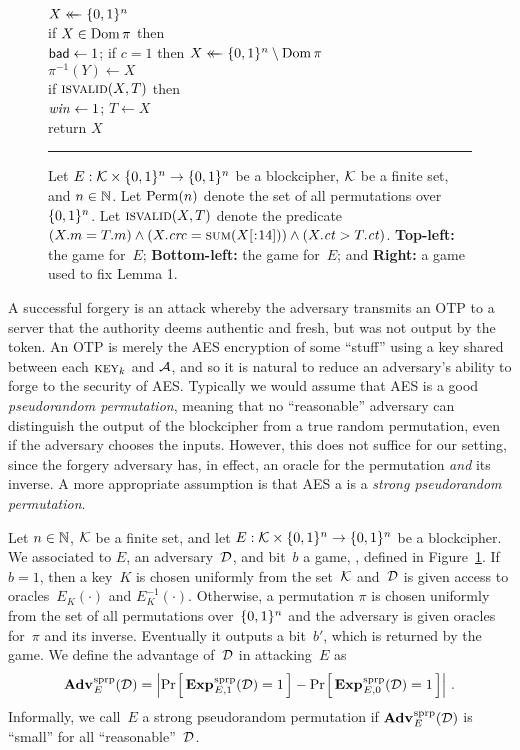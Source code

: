 \begin{figure}[t]
{      $X \mathrel{\leftarrow\mkern-14mu\leftarrow} \{0,1\}^n$\\
      if $X \in \mathrm{Dom}\, \pi$ then\\
      \tab $\mathsf{bad} \gets 1$; if $c=1$ then $X \mathrel{\leftarrow\mkern-14mu\leftarrow} \{0,1\}^n \setminus \mathrm{Dom}\, \pi$\\
      $\pi^{-1}(Y) \gets X$\\
      if $\textsc{isvalid}(X,T)$ then\\
      \tab $\mathit{win} \gets 1$; $T \gets X$\\
      return $X$
  }
  \caption{Let $E:\mathcal{K}\times\{0,1\}^n\to\{0,1\}^n$ be a blockcipher, $\mathcal{K}$ be a
    finite set, and $n\in\mathbb{N}$. Let $\mathrm{Perm}(n)$ denote the set of all permutations
    over $\{0,1\}^n$. Let $\textsc{isvalid}(X,T)$ denote the predicate $(X.m = T.m) \AND (X.\crc =
    \checksum(\substr(X,,14))) \AND (X.\ct > T.\ct)$.
  \textbf{Top-left:} the \forge game for~$E$;
  \textbf{Bottom-left:} the \sprp game for~$E$; and
  \textbf{Right:} a game used to fix Lemma 1.}
  \label{fig1}
  \vspace{6pt}
  \hrule
\end{figure}
A successful forgery is an attack whereby the adversary transmits an OTP to a
server that the authority deems authentic and fresh, but was not output by the
token.
%
An OTP is merely the AES encryption of some ``stuff'' using a key shared between
each $\textsc{key}_k$ and $\mathcal{A}$, and so it is natural to reduce an adversary's ability
to forge to the security of AES.
%
Typically we would assume that AES is a good \emph{pseudorandom permutation},
meaning that no ``reasonable'' adversary can distinguish the output of the
blockcipher from a true random permutation, even if the adversary chooses the
inputs.
%
However, this does not suffice for our setting, since the forgery adversary has,
in effect, an oracle for the permutation \emph{and} its inverse. A more
appropriate assumption is that AES a is a \emph{strong pseudorandom
permutation}.

Let $n\in\mathbb{N}$, $\mathcal{K}$ be a finite set, and let $E:\mathcal{K}\times\{0,1\}^n\to\{0,1\}^n$
be a blockcipher. We associated to $E$, an adversary~$\mathcal{D}$, and bit~$b$ a
game, \sprp, defined in Figure~\ref{fig1}.
%
If $b=1$, then a key~$K$ is chosen uniformly from the set~$\mathcal{K}$ and~$\mathcal{D}$ is
given access to oracles~$E_K(\cdot)$ and $E_K^{-1}(\cdot)$.
%
Otherwise, a permutation $\pi$ is chosen uniformly from the set of all
permutations over~$\{0,1\}^n$ and the adversary is given oracles for~$\pi$ and its
inverse.
%
Eventually it outputs a bit~$b'$, which is returned by the game. We define the
advantage of~$\mathcal{D}$ in attacking~$E$ as
\[
  \Adv{\sprp}_E(\advD) = \left| \Prob{\Exp{\sprp}_{E,1}(\advD)\outputs\true} -
                                \Prob{\Exp{\sprp}_{E,0}(\advD)\outputs\true}
                              \right|\,.
\]
Informally, we call~$E$ a strong pseudorandom permutation if
$\Adv{\sprp}_E(\advD)$ is ``small'' for all ``reasonable''~$\mathcal{D}$.

